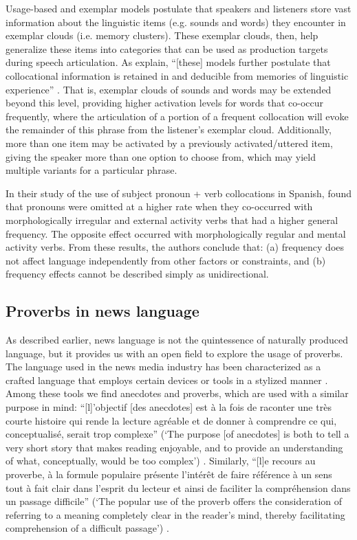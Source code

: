 \documentclass[output=paper,colorlinks,citecolor=brown,draftmode]{langscibook}
\begin{document}
Usage-based and exemplar models \citep[e.g.][]{jonhson1997speech} postulate that speakers and listeners store vast information about the linguistic items (e.g. sounds and words) they encounter in exemplar clouds (i.e. memory clusters). These exemplar clouds, then, help generalize these items into categories that can be used as production targets during speech articulation. As \citet{erker2012role} explain, ``[these] models further postulate that collocational information is retained in and deducible from memories of linguistic experience'' \parencite*[258]{erker2012role}. That is, exemplar clouds of sounds and words may be extended beyond this level, providing higher activation levels for words that co-occur frequently, where the articulation of a portion of a frequent collocation will evoke the remainder of this phrase from the listener's exemplar cloud. Additionally, more than one item may be activated by a previously activated/uttered item, giving the speaker more than one option to choose from, which may yield multiple variants for a particular phrase.

In their study of the use of subject pronoun + verb collocations in Spanish, \citet{erker2012role} found that  pronouns were omitted at a higher rate when they co-occurred with morphologically irregular and external activity verbs that had a higher general frequency. The opposite effect occurred with morphologically regular and mental activity verbs. From these results, the authors conclude that: (a) frequency does not affect language independently from other factors or constraints, and (b) frequency effects cannot be described simply as unidirectional.

\subsection{Proverbs in news language}

As described earlier, news language is not the quintessence of naturally produced language, but it provides us with an open field to explore the usage of proverbs. The language used in the news media industry has been characterized as a crafted language that employs certain devices or tools in a stylized manner \citep{mouriquand1997ecriture,conboy2013language}. Among these tools we find anecdotes and proverbs, which are used with a similar purpose in mind: ``[l]'objectif [des anecdotes] est {\`a} la fois de raconter une tr{\`e}s courte histoire qui rende la lecture agr{é}able et de donner {\`a} comprendre ce qui, conceptualis{é}, serait trop complexe'' (`The purpose [of anecdotes] is both to tell a very short story that makes reading enjoyable, and to provide an understanding of what, conceptually, would be too complex') \citep[97]{mouriquand1997ecriture}. Similarly, ``[l]e recours au proverbe, {\`a} la formule populaire pr{é}sente l'int{é}r{\^e}t de faire r{é}f{é}rence {\`a} un sens tout {\`a} fait clair dans l'esprit du lecteur et ainsi de faciliter la compr{é}hension dans un passage difficile'' (`The popular use of the proverb offers the consideration of referring to a meaning completely clear in the reader's mind, thereby facilitating comprehension of a difficult passage') \parencite*[102]{mouriquand1997ecriture}.
\end{document}
